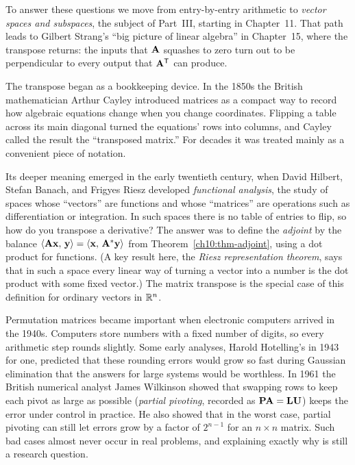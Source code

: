To answer these questions we move from entry-by-entry arithmetic to \emph{vector spaces and
subspaces}, the subject of Part~III, starting in Chapter~11. That path leads to Gilbert Strang's
``big picture of linear algebra'' in Chapter~15, where the transpose returns: the inputs that
$\mathbf{A}$ squashes to zero turn out to be perpendicular to every output that $\mathbf{A}^{\mathsf{T}}$ can produce.

\begin{historybox}
The transpose began as a bookkeeping device. In the 1850s the British mathematician Arthur Cayley
introduced matrices as a compact way to record how algebraic equations change when you change
coordinates. Flipping a table across its main diagonal turned the equations' rows into columns, and
Cayley called the result the ``transposed matrix.'' For decades it was treated mainly as a
convenient piece of notation.

Its deeper meaning emerged in the early twentieth century, when David Hilbert, Stefan Banach,
and Frigyes Riesz developed \emph{functional analysis}, the study of spaces whose ``vectors'' are
functions and whose ``matrices'' are operations such as differentiation or integration. In such
spaces there is no table of entries to flip, so how do you transpose a derivative? The answer was
to define the \emph{adjoint} by the balance
$\langle \mathbf{A}\mathbf{x},\, \mathbf{y} \rangle = \langle \mathbf{x},\, \mathbf{A}^{*}\mathbf{y} \rangle$ from
Theorem~\ref{ch10:thm-adjoint}, using a dot product for functions. (A key result here, the
\emph{Riesz representation theorem}, says that in such a space every linear way of turning a
vector into a number is the dot product with some fixed vector.) The matrix transpose is the
special case of this definition for ordinary vectors in $\mathbb{R}^n$.

Permutation matrices became important when electronic computers arrived in the 1940s. Computers
store numbers with a fixed number of digits, so every arithmetic step rounds slightly. Some early
analyses, Harold Hotelling's in 1943 for one, predicted that these rounding errors would grow so
fast during Gaussian elimination that the answers for large systems would be worthless. In 1961
the British numerical analyst James Wilkinson showed that swapping rows to keep each pivot as large
as possible (\emph{partial pivoting}, recorded as $\mathbf{P}\mathbf{A} = \mathbf{L}\mathbf{U}$) keeps the
error under control in practice. He also showed that in the worst case, partial pivoting can still
let errors grow by a factor of $2^{n-1}$ for an $n\times n$ matrix. Such bad cases almost never
occur in real problems, and explaining exactly why is still a research question.


\end{historybox}
